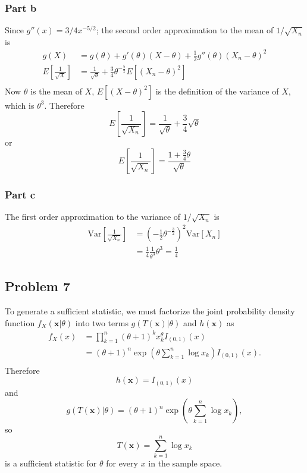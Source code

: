 \documentclass{article}
\begin{document}
\subsubsection*{Part b}
Since $g''(x) = 3/4x^{-5/2}$; the second order approximation to the mean of $1/\sqrt{X_n}$ is 
\[\begin{aligned}
g(X) &= g(\theta)+g'(\theta)(X-\theta)+\frac{1}{2}g''(\theta)(X_n-\theta)^2 \\
E\left[\frac{1}{\sqrt{X}}\right] &= \frac{1}{\sqrt{\theta}} + \frac{3}{4}\theta^{-\frac{5}{2}}E\left[(X_n - \theta)^2\right] \\
\end{aligned}\]
Now $\theta$ is the mean of $X$, $E\left[(X - \theta)^2\right]$ is the definition of the variance of $X$, which is $\theta^3$. Therefore
\[E\left[\frac{1}{\sqrt{X_n}}\right] = \frac{1}{\sqrt{\theta}} + \frac{3}{4}\sqrt{\theta}\] or 
\[E\left[\frac{1}{\sqrt{X_n}}\right] = \frac{1+\frac{3}{4}\theta}{\sqrt{\theta}}\]
\subsubsection*{Part c}
The first order approximation to the variance of $1/\sqrt{X_n}$ is 
\[\begin{aligned}
\text{Var}\left[\frac{1}{\sqrt{X_n}}\right] &= \left(-\frac{1}{2}\theta^{-\frac{3}{2}}\right)^2\text{Var}\left[X_n\right] \\
&= \frac{1}{4}\frac{1}{\theta^3}\theta^3 = \frac{1}{4}
\end{aligned}\]
\subsection*{Problem 7}
To generate a sufficient statistic, we must factorize the joint probability density function
$f_X(\mathbf{x}|\theta)$ into two terms $g(T(\mathbf{x})|\theta)$ and $h(\mathbf{x})$ as 
\[\begin{aligned}
f_X(x) &= \prod_{k=1}^n(\theta+1)^kx_k^\theta I_{(0,1)}(x) \\
&= (\theta+1)^n \exp\left(\theta\sum_{k=1}^n \log{x_k}\right) I_{(0,1)}(x).\\
\end{aligned}\]
Therefore 
\[h(\mathbf{x}) = I_{(0,1)}(x)\]
and 
\[g(T(\mathbf{x})|\theta) = (\theta+1)^n \exp\left(\theta\sum_{k=1}^n \log{x_k}\right),\]
so 
\[T(\mathbf{x}) = \sum_{k=1}^n \log{x_k}\]
is a sufficient statistic for $\theta$ for every $x$ in the sample space. 

 
\end{document}
